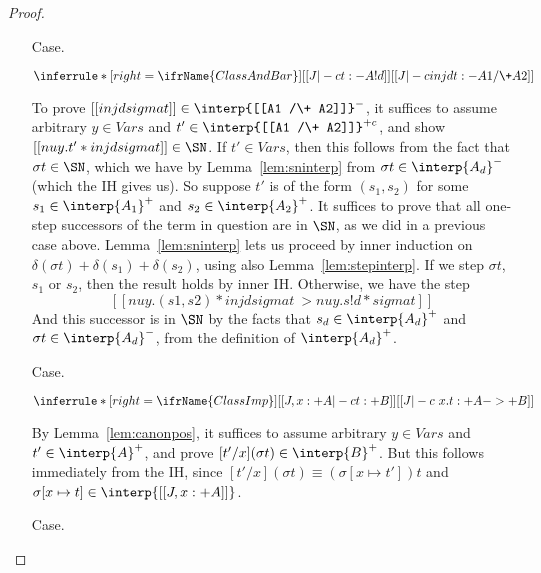 \begin{proof}
\begin{itemize}
\item[Case.]\ 

\vspace{-.2cm}
\begin{center}
\begin{math}
\inferrule* [right=\ifrName{ClassAndBar}] {[[J |-c t : - A ! d]]}{[[J |-c inj d t : - A1 /\+ A2]]}
\end{math}
\end{center}
To prove $[[inj d sigma t]]\in\interp{[[A1 /\+ A2]]}^-$, it suffices
to assume arbitrary $y\in\textit{Vars}$ and $t'\in\interp{[[A1 /\+
  A2]]}^{+c}$, and show $[[ nu y . t' * inj d sigma t]]\in\SN$.  If
$t'\in\textit{Vars}$, then this follows from the fact that $\sigma
t\in\SN$, which we have by Lemma~\ref{lem:sninterp} from $\sigma
t\in\interp{A_d}^-$ (which the IH gives us).  So suppose $t'$ is of
the form $(s_1,s_2)$ for some $s_1\in\interp{A_1}^+$ and
$s_2\in\interp{A_2}^+$.  It suffices to prove that all one-step
successors of the term in question are in $\SN$, as we did in a
previous case above.  Lemma~\ref{lem:sninterp} lets us proceed by
inner induction on $\delta(\sigma t) + \delta(s_1) + \delta(s_2)$,
using also Lemma~\ref{lem:stepinterp}.  If we step $\sigma t$, $s_1$
or $s_2$, then the result holds by inner IH.  Otherwise, we have the
step
\[
[[ nu y . (s1,s2) * inj d sigma t ~> nu y . s ! d * sigma t]]
\]
And this successor is in $\SN$ by the facts that $s_d\in\interp{A_d}^+$
and $\sigma t\in\interp{A_d}^-$, from the definition of $\interp{A_d}^+$.

\item[Case.]\ 

\vspace{-.2cm}
\begin{center}
\begin{math}
\inferrule* [right=\ifrName{ClassImp}] {[[J , x : + A |-c t : + B]]}{[[J |-c \ x . t : + A ->+ B]]}
\end{math}
\end{center}
By Lemma~\ref{lem:canonpos}, it suffices to assume arbitrary $y\in\textit{Vars}$ and $t'\in\interp{A}^+$,
and prove $[t'/x](\sigma t)\in\interp{B}^+$.  But this follows immediately from the IH, since
$[t'/x](\sigma t)\equiv (\sigma[x\mapsto t']) t$ and $\sigma[x\mapsto t]\in\interp{[[J , x : + A]]}$.

\item[Case.]\ 


\end{itemize}
\end{proof}
